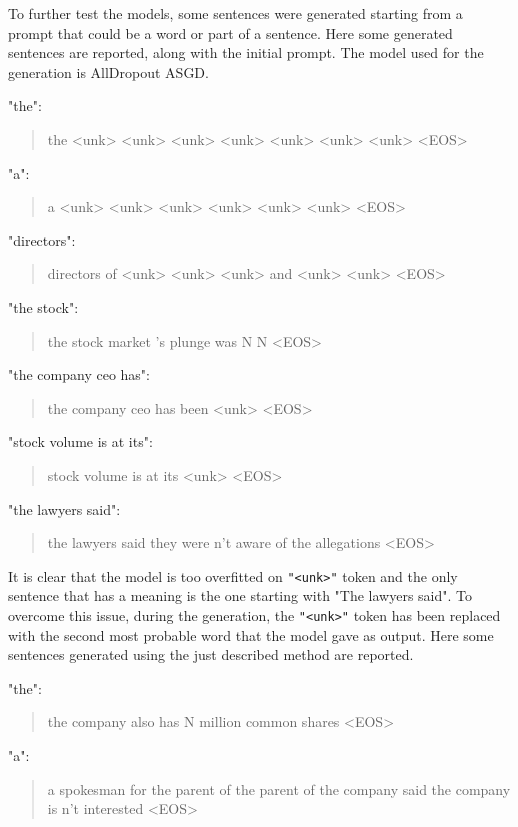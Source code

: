 \documentclass[a4paper]{article}
\begin{document}
To further test the models, some sentences were generated starting from a prompt that could be a word or part of a sentence.
Here some generated sentences are reported, along with the initial prompt. The model used for the generation is AllDropout ASGD.

"the":
\begin{quote}
    the <unk> <unk> <unk> <unk> <unk> <unk> <unk> <EOS>
\end{quote}

"a":
\begin{quote}
    a <unk> <unk> <unk> <unk> <unk> <unk> <EOS>
\end{quote}

"directors":
\begin{quote}
    directors of <unk> <unk> <unk> and <unk> <unk> <EOS>
\end{quote}

"the stock":
\begin{quote}
    the stock market 's plunge was N N <EOS>
\end{quote}

"the company ceo has":
\begin{quote}
    the company ceo has been <unk> <EOS>
\end{quote}

"stock volume is at its":
\begin{quote}
    stock volume is at its <unk> <EOS>
\end{quote}

"the lawyers said":
\begin{quote}
the lawyers said they were n't aware of the allegations <EOS>
\end{quote}

It is clear that the model is too overfitted on \lstinline{"<unk>"} token and the only sentence that has a meaning is the one starting with "The lawyers said". 
To overcome this issue, during the generation, the \lstinline{"<unk>"} token has been replaced with the second most probable word
that the model gave as output.
Here some sentences generated using the just described method are reported.

"the":
\begin{quote}
    the company also has N million common shares <EOS>
\end{quote}

"a":
\begin{quote}
    a spokesman for the parent of the parent of the company said the company is n't interested <EOS>
\end{quote}
\end{document}
